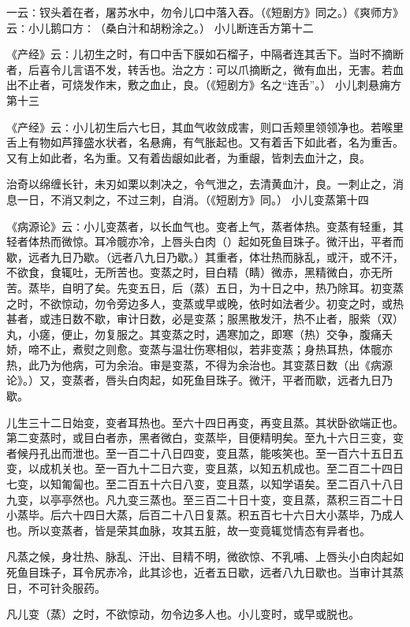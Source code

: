 \documentclass[a4paper,12pt,UTF8,twoside]{ctexbook}
\begin{document}
一云∶钗头着在者，屠苏水中，勿令儿口中落入吞。（《短剧方》同之。）《爽师方》云∶小儿鹅口方∶（桑白汁和胡粉涂之。）
小儿断连舌方第十二

《产经》云∶儿初生之时，有口中舌下膜如石榴子，中隔者连其舌下。当时不摘断者，后喜令儿言语不发，转舌也。治之方∶可以爪摘断之，微有血出，无害。若血出不止者，可烧发作末，敷之血止，良。（《短剧方》名之“连舌”。）
小儿刺悬痈方第十三

《产经》云∶小儿初生后六七日，其血气收敛成害，则口舌颊里领领净也。若喉里舌上有物如芦箨盛水状者，名悬痈，有气胀起也。又有着舌下如此者，名为重舌。又有上如此者，名为重。又有着齿龈如此者，为重龈，皆刺去血汁之，良。

治奇以绵缠长针，未刃如栗以刺决之，令气泄之，去清黄血汁，良。一刺止之，消息一日，不消又刺之，不过三刺，自消。（《短剧方》同。）
小儿变蒸第十四

《病源论》云∶小儿变蒸者，以长血气也。变者上气，蒸者体热。变蒸有轻重，其轻者体热而微惊。耳冷髋亦冷，上唇头白肉（）起如死鱼目珠子。微汗出，平者而歇，远者九日乃歇。（远者八九日乃歇。）其重者，体壮热而脉乱，或汗，或不汗，不欲食，食辄吐，无所苦也。变蒸之时，目白精（睛）微赤，黑精微白，亦无所苦。蒸毕，自明了矣。先变五日，后（蒸）五日，为十日之中，热乃除耳。初变蒸之时，不欲惊动，勿令旁边多人，变蒸或早或晚，依时如法者少。初变之时，或热甚者，或违日数不歇，审计日数，必是变蒸；服黑散发汗，热不止者，服紫（双）丸，小瘥，便止，勿复服之。其变蒸之时，遇寒加之，即寒（热）交争，腹痛夭娇，啼不止，煮熨之则愈。变蒸与温壮伤寒相似，若非变蒸；身热耳热，体髋亦热，此乃为他病，可为余治。审是变蒸，不得为余治也。其变蒸日数（出《病源论》。）又，变蒸者，唇头白肉起，如死鱼目珠子。微汗，平者而歇，远者九日乃歇。

儿生三十二日始变，变者耳热也。至六十四日再变，再变且蒸。其状卧欲端正也。第二变蒸时，或目白者赤，黑者微白，变蒸毕，目便精明矣。至九十六日三变，变者候丹孔出而泄也。至一百二十八日四变，变且蒸，能咳笑也。至一百六十五日五变，以成机关也。至一百九十二日六变，变且蒸，以知五机成也。至二百二十四日七变，以知匍匐也。至二百五十六日八变，变且蒸，以知学语矣。至二百八十八日九变，以亭亭然也。凡九变三蒸也。至三百二十日十变，变且蒸，蒸积三百二十日小蒸毕。后六十四日大蒸，后百二十八日复蒸。积五百七十六日大小蒸毕，乃成人也。所以变蒸者，皆是荣其血脉，攻其五脏，故一变竟辄觉情态有异者也。

凡蒸之候，身壮热、脉乱、汗出、目精不明，微欲惊、不乳哺、上唇头小白肉起如死鱼目珠子，耳令尻赤冷，此其诊也，近者五日歇，远者八九日歇也。当审计其蒸日，不可针灸服药。

凡儿变（蒸）之时，不欲惊动，勿令边多人也。小儿变时，或早或脱也。
\end{document}

